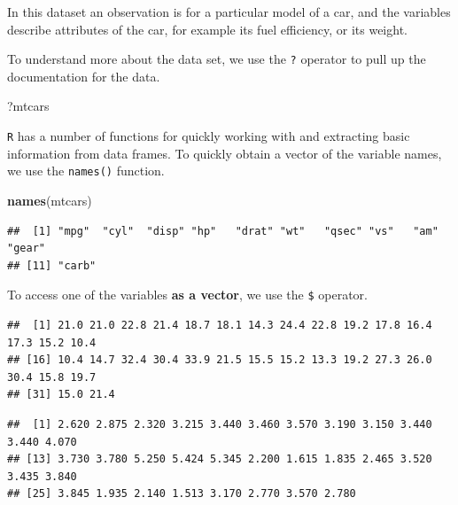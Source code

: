 \documentclass[]{book}
\newenvironment{Shaded}{\begin{snugshade}}{\end{snugshade}}
\newcommand{\KeywordTok}[1]{\textcolor[rgb]{0.13,0.29,0.53}{\textbf{#1}}}
\newcommand{\OperatorTok}[1]{\textcolor[rgb]{0.81,0.36,0.00}{\textbf{#1}}}
\newcommand{\NormalTok}[1]{#1}
\begin{document}
In this dataset an observation is for a particular model of a car, and
the variables describe attributes of the car, for example its fuel
efficiency, or its weight.

To understand more about the data set, we use the \texttt{?} operator to
pull up the documentation for the data.

\begin{Shaded}
\begin{Highlighting}[]
\NormalTok{?mtcars}
\end{Highlighting}
\end{Shaded}

\texttt{R} has a number of functions for quickly working with and
extracting basic information from data frames. To quickly obtain a
vector of the variable names, we use the \texttt{names()} function.

\begin{Shaded}
\begin{Highlighting}[]
\KeywordTok{names}\NormalTok{(mtcars)}
\end{Highlighting}
\end{Shaded}

\begin{verbatim}
##  [1] "mpg"  "cyl"  "disp" "hp"   "drat" "wt"   "qsec" "vs"   "am"   "gear"
## [11] "carb"
\end{verbatim}

To access one of the variables \textbf{as a vector}, we use the
\texttt{\$} operator.

\begin{Shaded}
\end{Shaded}

\begin{verbatim}
##  [1] 21.0 21.0 22.8 21.4 18.7 18.1 14.3 24.4 22.8 19.2 17.8 16.4 17.3 15.2 10.4
## [16] 10.4 14.7 32.4 30.4 33.9 21.5 15.5 15.2 13.3 19.2 27.3 26.0 30.4 15.8 19.7
## [31] 15.0 21.4
\end{verbatim}

\begin{Shaded}
\end{Shaded}

\begin{verbatim}
##  [1] 2.620 2.875 2.320 3.215 3.440 3.460 3.570 3.190 3.150 3.440 3.440 4.070
## [13] 3.730 3.780 5.250 5.424 5.345 2.200 1.615 1.835 2.465 3.520 3.435 3.840
## [25] 3.845 1.935 2.140 1.513 3.170 2.770 3.570 2.780
\end{verbatim}
\end{document}
